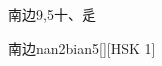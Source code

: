 \begin{entry}{南边}{9,5}{⼗、⾡}
  \begin{phonetics}{南边}{nan2bian5}[][HSK 1]
  \end{phonetics}
\end{entry}
